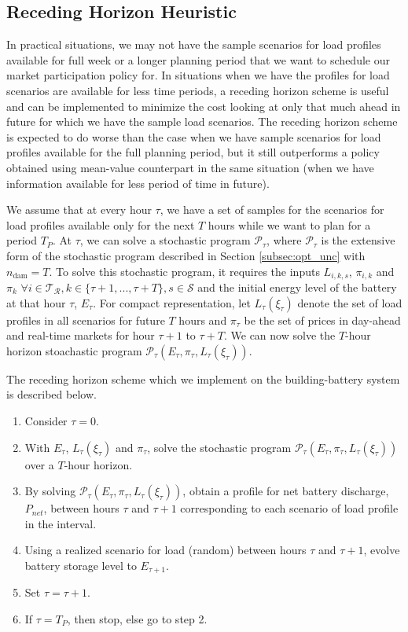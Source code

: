 \documentclass[11pt,twoside]{article}
\begin{document}
\FloatBarrier
\subsection{Receding Horizon Heuristic}
In practical situations, we may not have the sample scenarios for load profiles available for full week or a longer planning period that we want to schedule our market participation policy for. In situations when we have the profiles for load scenarios are available for less time periods, a receding horizon scheme is useful and can be implemented to minimize the cost looking at only that much ahead in future for which we have the sample load scenarios. The receding horizon scheme is expected to do worse than the case when we have sample scenarios for load profiles available for the full planning period, but it still outperforms a policy obtained using mean-value counterpart in the same situation (when we have information available for less period of time in future). 

We assume that at every hour $\tau$, we have a set of samples for the scenarios for load profiles available only for the next $T$ hours while we want to plan for a period $T_{P}$. At $\tau$, we can solve a stochastic program $\mathcal{P}_{\tau}$, where $\mathcal{P}_{\tau}$ is the extensive form of the stochastic program described in Section \ref{subsec:opt_unc} with $n_\text{dam} = T$. To solve this stochastic program, it requires the inputs $L_{i,k,s}$, $\pi_{i,k}$ and $\pi_k$ $\forall i \in \mathcal{T_R}, k \in \{\tau+1, ..., \tau+T\}, s \in \mathcal{S}$ and the initial energy level of the battery at that hour $\tau$, $E_{\tau}$. For compact representation, let $L_{\tau}(\xi_{\tau})$ denote the set of load profiles in all scenarios for future $T$ hours and $\pi_{\tau}$ be the set of prices in day-ahead and real-time markets for hour $\tau+1$ to $\tau+T$. We can now solve the $T$-hour horizon stoachastic program $\mathcal{P}_{\tau}\left(E_{\tau}, \pi_{\tau}, L_{\tau}(\xi_{\tau})\right)$.

The receding horizon scheme which we implement on the building-battery system is described below.
\begin{enumerate}
\item Consider $\tau = 0$.
\item With $E_\tau$, $L_{\tau}(\xi_{\tau})$ and $\pi_{\tau}$, solve the stochastic program $\mathcal{P}_{\tau}\left(E_{\tau}, \pi_{\tau}, L_{\tau}(\xi_{\tau})\right)$ over a $T$-hour horizon.
\item By solving $\mathcal{P}_{\tau}\left(E_{\tau}, \pi_{\tau}, L_{\tau}(\xi_{\tau})\right)$, obtain a profile for net battery discharge, $P_{net}$, between hours $\tau$ and $\tau+1$ corresponding to each scenario of load profile in the interval.
\item Using a realized scenario for load (random) between hours $\tau$ and $\tau+1$, evolve battery storage level to $E_{\tau+1}$.
\item Set $\tau = \tau+1$.
\item If $\tau = T_P$, then stop, else go to step 2.
\end{enumerate}
\end{document}
